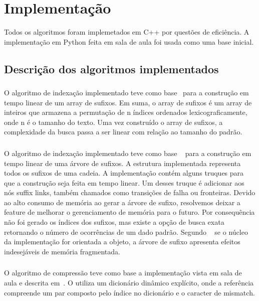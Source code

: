 \section{Implementação}
Todos os algoritmos foram implemetados em C++ por questões de eficiência. A
implementação em Python feita em sala de aula foi usada como uma base inicial.

\subsection{Descrição dos algoritmos implementados}

\subsubsection{\lsa}
O algoritmo de indexação  implementado teve como
base~\cite{KarkkainenS03} para a construção em
tempo linear de um array de sufixos. Em suma, o array de sufixos é um array de
inteiros que armazena a permutação de n índices ordenados lexicograficamente,
onde n é o tamanho do texto. Uma vez construído o array de sufixos, a
complexidade da busca passa a ser linear com relação ao tamanho do padrão.

\subsubsection{\lst}
O algoritmo de indexação implementado teve como
base ~\cite{UkkonenST} para a construção em tempo linear
de uma árvore de sufixos. A estrutura implementada representa
todos os sufixos de uma cadeia. A implementação contém alguns truques
para que a construção seja feita em tempo linear. Um desses truque é adicionar aos
nós suffix links, também chamados como transições de falha ou fronteiras. Devido 
ao alto consumo de memória ao gerar a árvore de sufixo, resolvemos deixar a feature
de melhorar o gerenciamento de memória para o futuro. Por consequência não foi gerado os índices dos sufixos, mas existe a opção de busca exata retornando o número de ocorrências de um dado padrão. Segundo ~\cite{BogdanCraig} se o núcleo da implementação for orientada a objeto, a árvore de sufixo apresenta efeitos indesejáveis
de memória fragmentada.

\subsubsection{\lz}

O algoritmo de compressão \lz teve como base a implementação vista em sala de
aula e descrita em~\cite{Storer:1987:DCM:42791}. O \lz utiliza um dicionário
dinâmico explícito, onde a referência compreende um par composto pelo índice no
dicionário e o caracter de mismatch.

